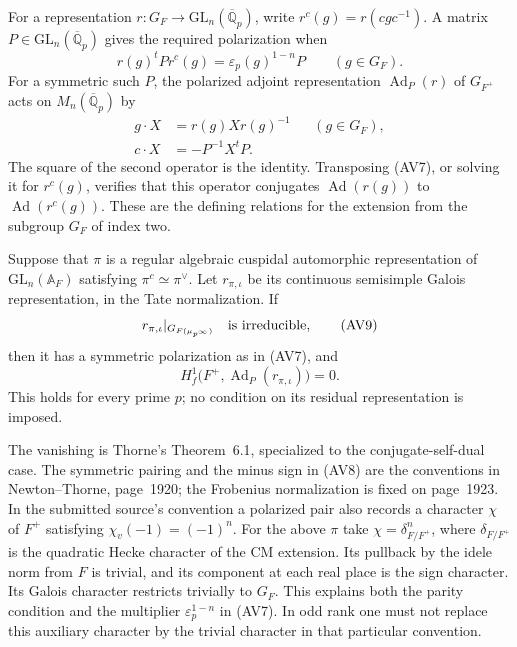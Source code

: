 For a representation
$r:G_F\longrightarrow\mathrm{GL}_n(\overline{\mathbb Q}_p)$,
write $r^c(g)=r(cgc^{-1})$. A matrix $P\in
\mathrm{GL}_n(\overline{\mathbb Q}_p)$ gives the required
polarization when
\[
           r(g)^t P r^c(g)=\varepsilon_p(g)^{1-n}P
                         \qquad(g\in G_F).                    \tag{AV7}
\]
For a symmetric such $P$, the polarized adjoint representation
$\operatorname{Ad}_P(r)$ of $G_{F^+}$ acts on
$M_n(\overline{\mathbb Q}_p)$ by
\[
 \begin{aligned}
 g\cdot X&=r(g)Xr(g)^{-1}&& (g\in G_F),\\
 c\cdot X&=-P^{-1}X^tP.
 \end{aligned}                                                 \tag{AV8}
\]
The square of the second operator is the identity. Transposing
(AV7), or solving it for $r^c(g)$, verifies that this operator
conjugates $\operatorname{Ad}(r(g))$ to
$\operatorname{Ad}(r^c(g))$. These are the defining relations
for the extension from the subgroup $G_F$ of index two.

\begin{theorem}\label{av-thorne}
Suppose that $\pi$ is a regular algebraic cuspidal automorphic
representation of $\mathrm{GL}_n(\mathbb A_F)$ satisfying
$\pi^c\simeq\pi^\vee$. Let $r_{\pi,\iota}$ be its continuous
semisimple Galois representation, in the Tate normalization.
If
\[
 r_{\pi,\iota}|_{G_{F(\mu_{p^\infty})}}
                         \quad\hbox{is irreducible},            \tag{AV9}
\]
then it has a symmetric polarization as in (AV7), and
\[
 H^1_f\bigl(F^+,\operatorname{Ad}_P(r_{\pi,\iota})\bigr)=0.
                                                               \tag{AV10}
\]
This holds for every prime $p$; no condition on its residual
representation is imposed.
\end{theorem}

The vanishing is Thorne's Theorem~6.1, specialized to the
conjugate-self-dual case. The symmetric pairing and the
minus sign in (AV8) are the conventions in Newton--Thorne,
page~1920; the Frobenius normalization is fixed on page~1923.
\cite{thorne-adjoint-2022,newton-thorne-adjoint-2023}
In the submitted source's convention a polarized pair also
records a character $\chi$ of $F^+$ satisfying
$\chi_v(-1)=(-1)^n$. For the above $\pi$ take
$\chi=\delta_{F/F^+}^n$, where $\delta_{F/F^+}$ is the
quadratic Hecke character of the CM extension. Its pullback
by the idele norm from $F$ is trivial, and its component at
each real place is the sign character. Its Galois character
restricts trivially to $G_F$. This explains both the parity
condition and the multiplier $\varepsilon_p^{1-n}$ in (AV7).
In odd rank one must not replace this auxiliary character by
the trivial character in that particular convention.

